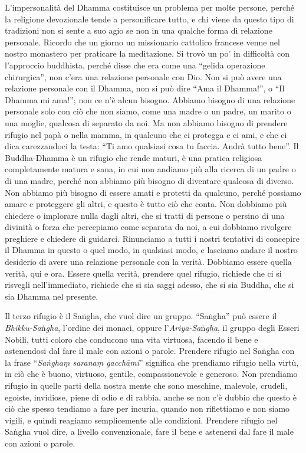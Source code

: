 L'impersonalità del Dhamma costituisce un problema per molte persone,
perché la religione devozionale tende a personificare tutto, e chi viene
da questo tipo di tradizioni non si sente a suo agio se non in una
qualche forma di relazione personale. Ricordo che un giorno un
missionario cattolico francese venne nel nostro monastero per praticare
la meditazione. Si trovò un po' in difficoltà con l'approccio buddhista,
perché disse che era come una ``gelida operazione chirurgica'', non
c'era una relazione personale con Dio. Non si può avere una relazione
personale con il Dhamma, non si può dire ``Ama il Dhamma!'', o ``Il
Dhamma mi ama!''; non ce n'è alcun bisogno. Abbiamo bisogno di una
relazione personale solo con ciò che non siamo, come una madre o un
padre, un marito o una moglie, qualcosa di separato da noi. Ma non
abbiamo bisogno di prendere rifugio nel papà o nella mamma, in qualcuno
che ci protegga e ci ami, e che ci dica carezzandoci la testa: ``Ti amo
qualsiasi cosa tu faccia. Andrà tutto bene''. Il Buddha-Dhamma è un
rifugio che rende maturi, è una pratica religiosa completamente matura e
sana, in cui non andiamo più alla ricerca di un padre o di una madre,
perché non abbiamo più bisogno di diventare qualcosa di diverso. Non
abbiamo più bisogno di essere amati e protetti da qualcuno, perché
possiamo amare e proteggere gli altri, e questo è tutto ciò che conta.
Non dobbiamo più chiedere o implorare nulla dagli altri, che si tratti
di persone o persino di una divinità o forza che percepiamo come
separata da noi, a cui dobbiamo rivolgere preghiere e chiedere di
guidarci. Rinunciamo a tutti i nostri tentativi di concepire il Dhamma
in questo o quel modo, in qualsiasi modo, e lasciamo andare il nostro
desiderio di avere una relazione personale con la verità. Dobbiamo
essere quella verità, qui e ora. Essere quella verità, prendere quel
rifugio, richiede che ci si risvegli nell'immediato, richiede che si sia
saggi adesso, che si sia Buddha, che si sia Dhamma nel presente.

Il terzo rifugio è il Saṅgha, che vuol dire un gruppo. ``Saṅgha'' può
essere il \emph{Bhikku-Sa}ṅ\emph{gha}, l'ordine dei monaci, oppure
l'\emph{Ariya-Sa}ṅ\emph{gha}, il gruppo degli Esseri Nobili, tutti
coloro che conducono una vita virtuosa, facendo il bene e astenendosi
dal fare il male con azioni o parole. Prendere rifugio nel Saṅgha con la
frase ``\emph{Saṅghaṃ saranaṃ gacchāmi}'' significa che prendiamo
rifugio nella virtù, in ciò che è buono, virtuoso, gentile,
compassionevole e generoso. Non prendiamo rifugio in quelle parti della
nostra mente che sono meschine, malevole, crudeli, egoiste, invidiose,
piene di odio e di rabbia, anche se non c'è dubbio che questo è ciò che
spesso tendiamo a fare per incuria, quando non riflettiamo e non siamo
vigili, e quindi reagiamo semplicemente alle condizioni. Prendere
rifugio nel Saṅgha vuol dire, a livello convenzionale, fare il bene e
astenersi dal fare il male con azioni o parole.

